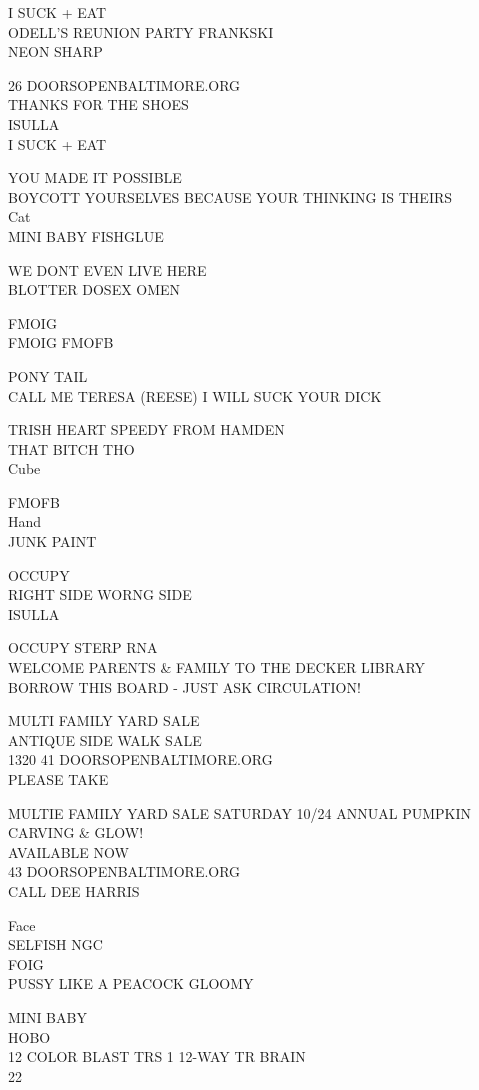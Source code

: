 \documentclass[10pt,letterpaper]{article}
\begin{document}
I SUCK + EAT\\
ODELL'S REUNION PARTY FRANKSKI\\
NEON SHARP

26 DOORSOPENBALTIMORE.ORG\\
THANKS FOR THE SHOES\\
ISULLA\\
I SUCK + EAT

YOU MADE IT POSSIBLE\\
BOYCOTT YOURSELVES BECAUSE YOUR THINKING IS THEIRS\\
Cat\\
MINI BABY FISHGLUE

WE DONT EVEN LIVE HERE\\
BLOTTER DOSEX OMEN

FMOIG\\
FMOIG FMOFB

PONY TAIL\\
CALL ME TERESA (REESE) I WILL SUCK YOUR DICK

TRISH HEART SPEEDY FROM HAMDEN\\
THAT BITCH THO\\
Cube

FMOFB\\
Hand\\
JUNK PAINT

OCCUPY\\
RIGHT SIDE WORNG SIDE\\
ISULLA

OCCUPY STERP RNA\\
WELCOME PARENTS \& FAMILY TO THE DECKER LIBRARY\\
BORROW THIS BOARD {-} JUST ASK CIRCULATION!

MULTI FAMILY YARD SALE\\
ANTIQUE SIDE WALK SALE\\
1320 41 DOORSOPENBALTIMORE.ORG\\
PLEASE TAKE

MULTIE FAMILY YARD SALE SATURDAY 10/24 ANNUAL PUMPKIN CARVING \& GLOW!\\
AVAILABLE NOW\\
43 DOORSOPENBALTIMORE.ORG\\
CALL DEE HARRIS

Face\\
SELFISH NGC\\
FOIG\\
PUSSY LIKE A PEACOCK GLOOMY

MINI BABY\\
HOBO\\
12 COLOR BLAST TRS 1 12{-}WAY TR BRAIN\\
22
\end{document}
